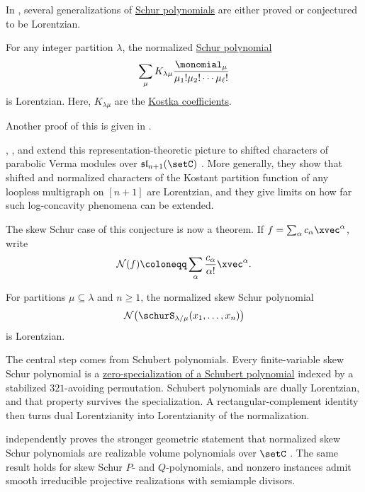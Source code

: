 In \cite{HuhMatherneMezarosDizier2022}, several generalizations of \hyperref[schurS]{Schur polynomials}
are either proved or conjectured to be Lorentzian.
\begin{theorem}
For any integer partition $\lambda$, the normalized \hyperref[schurS]{Schur polynomial}
\[
   \sum_{ \mu } K_{\lambda \mu} \frac{\monomial_\mu}{\mu_1! \mu_2 ! \dotsm \mu_\ell !}
\]
is Lorentzian. Here, $K_{\lambda \mu}$ are the
\hyperref[kostkaCoefficient]{Kostka coefficients}.
\end{theorem}
Another proof of this is given in \cite{RossToma2023}.

, , and
 extend this representation-theoretic
picture to shifted characters of parabolic Verma modules over
$\mathfrak{sl}_{n+1}(\setC)$ \cite{KhareMatherneDizier2025x}.  More generally,
they show that shifted and normalized characters of the Kostant partition
function of any loopless multigraph on $[n+1]$ are Lorentzian, and they give
limits on how far such log-concavity phenomena can be extended.


The skew Schur case of this conjecture is now a theorem.  If
\(f=\sum_\alpha c_\alpha\xvec^\alpha\), write
\[
  \mathcal{N}(f)
  \coloneqq
  \sum_\alpha\frac{c_\alpha}{\alpha!}\xvec^\alpha.
\]

\begin{theorem}
\label{lorentzianSkewSchur}
For partitions \(\mu\subseteq\lambda\) and \(n\geq1\), the normalized skew
Schur polynomial
\[
  \mathcal{N}\bigl(
    \schurS_{\lambda/\mu}(x_1,\dotsc,x_n)
  \bigr)
\]
is Lorentzian.
\end{theorem}

The central step comes from Schubert polynomials.  Every finite-variable skew
Schur polynomial is a
\hyperref[skewSchurFiniteSchubertSpecialization]{zero-specialization of a
Schubert polynomial} indexed by a stabilized \(321\)-avoiding permutation.
Schubert polynomials are dually Lorentzian, and that property survives the
specialization.  A rectangular-complement identity then turns dual
Lorentzianity into Lorentzianity of the normalization.

 independently proves the stronger geometric
statement that normalized skew Schur polynomials are realizable volume
polynomials over \(\setC\) \cite{NguyenDang2026x}.  The same result holds for
skew Schur \(P\)- and \(Q\)-polynomials, and nonzero instances admit smooth
irreducible projective realizations with semiample divisors.

